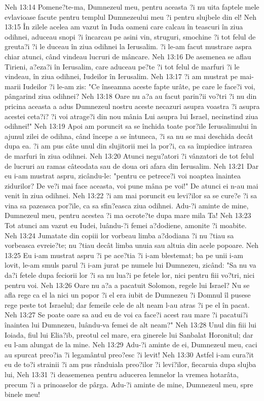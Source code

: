 Neh 13:14  Pomene?te-ma, Dumnezeul meu, pentru aceasta ?i nu uita faptele mele evlavioase facute pentru templul Dumnezeului meu ?i pentru slujbele din el!
Neh 13:15  În zilele acelea am vazut în Iuda oameni care calcau în teascuri în ziua odihnei, aduceau snopi ?i încarcau pe asini vin, struguri, smochine ?i tot felul de greuta?i ?i le duceau în ziua odihnei la Ierusalim. ?i le-am facut mustrare aspra chiar atunci, când vindeau lucruri de mâncare.
Neh 13:16  De asemenea se aflau Tirieni, a?eza?i în Ierusalim, care aduceau pe?te ?i tot felul de marfuri ?i le vindeau, în ziua odihnei, Iudeilor în Ierusalim.
Neh 13:17  ?i am mustrat pe mai-marii Iudeilor ?i le-am zis: "Ce înseamna aceste fapte urâte, pe care le face?i voi, pângarind ziua odihnei?
Neh 13:18  Oare nu a?a au facut parin?ii vo?tri ?i nu din pricina aceasta a adus Dumnezeul nostru aceste necazuri asupra voastra ?i asupra acestei ceta?i? ?i voi atrage?i din nou mânia Lui asupra lui Israel, necinstind ziua odihnei!"
Neh 13:19  Apoi am poruncit sa se închida toate por?ile Ierusalimului în ajunul zilei de odihna, când începe a se întuneca, ?i sa nu se mai deschida decât dupa ea. ?i am pus câte unul din slujitorii mei la por?i, ca sa împiedice intrarea de marfuri în ziua odihnei.
Neh 13:20  Atunci negu?atori ?i vânzatori de tot felul de lucruri au ramas câteodata sau de doua ori afara din Ierusalim.
Neh 13:21  Dar eu i-am mustrat aspru, zicându-le: "pentru ce petrece?i voi noaptea înaintea zidurilor? De ve?i mai face aceasta, voi pune mâna pe voi!" De atunci ei n-au mai venit în ziua odihnei.
Neh 13:22  ?i am mai poruncit eu levi?ilor sa se cure?e ?i sa vina sa pazeasca por?ile, ca sa sfin?easca ziua odihnei. Adu-?i aminte de mine, Dumnezeul meu, pentru acestea ?i ma ocrote?te dupa mare mila Ta!
Neh 13:23  Tot atunci am vazut eu Iudei, luându-?i femei a?dodiene, amonite ?i moabite.
Neh 13:24  Jumatate din copiii lor vorbeau limba a?dodiana ?i nu ?tiau sa vorbeasca evreie?te; nu ?tiau decât limba unuia sau altuia din acele popoare.
Neh 13:25  Eu i-am mustrat aspru ?i pe ace?tia ?i i-am blestemat; ba pe unii i-am lovit, le-am smuls parul ?i i-am jurat pe numele lui Dumnezeu, zicând: "Sa nu va da?i fetele dupa feciorii lor ?i sa nu lua?i pe fetele lor, nici pentru fiii vo?tri, nici pentru voi.
Neh 13:26  Oare nu a?a a pacatuit Solomon, regele lui Israel? Nu se afla rege ca el la nici un popor ?i el era iubit de Dumnezeu ?i Domnul îl pusese rege peste tot Israelul; dar femeile cele de alt neam l-au atras ?i pe el în pacat.
Neh 13:27  Se poate oare sa aud eu de voi ca face?i acest rau mare ?i pacatui?i înaintea lui Dumnezeu, luându-va femei de alt neam?"
Neh 13:28  Unul din fiii lui Ioiada, fiul lui Elia?ib, preotul cel mare, era ginerele lui Sanbalat Horonitul; dar eu l-am alungat de la mine.
Neh 13:29  Adu-?i aminte de ei, Dumnezeul meu, caci au spurcat preo?ia ?i legamântul preo?esc ?i levit!
Neh 13:30  Astfel i-am cura?it eu de to?i strainii ?i am pus rânduiala preo?ilor ?i levi?ilor, fiecaruia dupa slujba lui,
Neh 13:31  ?i deasemenea pentru aducerea lemnelor la vremea hotarâta, precum ?i a prinoaselor de pârga. Adu-?i aminte de mine, Dumnezeul meu, spre binele meu!



